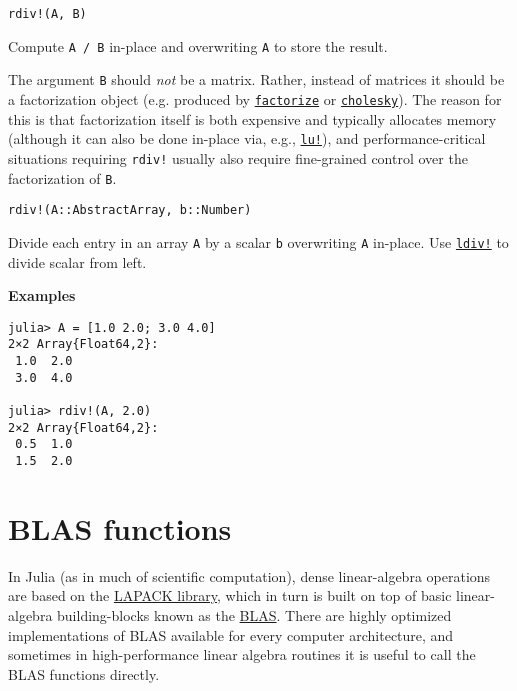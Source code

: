 \begin{adjustwidth}{2em}{0pt}


\begin{verbatim}
rdiv!(A, B)
\end{verbatim}

Compute \texttt{A / B} in-place and overwriting \texttt{A} to store the result.

The argument \texttt{B} should \emph{not} be a matrix.  Rather, instead of matrices it should be a factorization object (e.g. produced by \hyperlink{7042962205548658937}{\texttt{factorize}} or \hyperlink{7653413936706994771}{\texttt{cholesky}}). The reason for this is that factorization itself is both expensive and typically allocates memory (although it can also be done in-place via, e.g., \hyperlink{3268903080173564842}{\texttt{lu!}}), and performance-critical situations requiring \texttt{rdiv!} usually also require fine-grained control over the factorization of \texttt{B}.




\begin{lstlisting}
rdiv!(A::AbstractArray, b::Number)
\end{lstlisting}

Divide each entry in an array \texttt{A} by a scalar \texttt{b} overwriting \texttt{A} in-place.  Use \hyperlink{11817740014578453690}{\texttt{ldiv!}} to divide scalar from left.

\textbf{Examples}


\begin{verbatim}
julia> A = [1.0 2.0; 3.0 4.0]
2×2 Array{Float64,2}:
 1.0  2.0
 3.0  4.0

julia> rdiv!(A, 2.0)
2×2 Array{Float64,2}:
 0.5  1.0
 1.5  2.0
\end{verbatim}



\end{adjustwidth}

\hypertarget{11716155958635895745}{}


\section{BLAS functions}



In Julia (as in much of scientific computation), dense linear-algebra operations are based on the \href{http://www.netlib.org/lapack/}{LAPACK library}, which in turn is built on top of basic linear-algebra building-blocks known as the \href{http://www.netlib.org/blas/}{BLAS}. There are highly optimized implementations of BLAS available for every computer architecture, and sometimes in high-performance linear algebra routines it is useful to call the BLAS functions directly.



